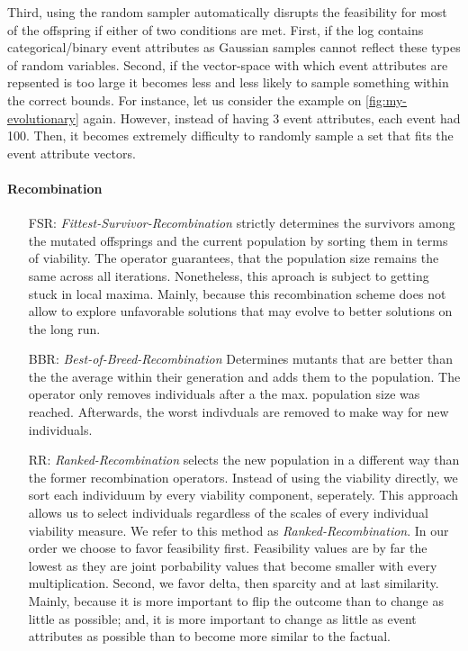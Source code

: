 \documentclass[./../../paper.tex]{subfiles}
\begin{document}
Third, using the random sampler automatically disrupts the feasibility for most of the offspring if either of two conditions are met. First, if the log contains categorical/binary event attributes as Gaussian samples cannot reflect these types of random variables. Second, if the vector-space with which event attributes are repsented is too large it becomes less and less likely to sample something within the correct bounds.
For instance, let us consider the example on \autoref{fig:my-evolutionary} again.
However, instead of having 3 event attributes, each event had 100. Then, it becomes extremely difficulty to randomly sample a set that fits the event attribute vectors.

\paragraph{Recombination}
\begin{enumerate}
    \item[FSR:] \emph{Fittest-Survivor-Recombination} strictly determines the survivors among the mutated offsprings and the current population by sorting them in terms of viability.
          The operator guarantees, that the population size remains the same across all iterations.
          Nonetheless, this aproach is subject to getting stuck in local maxima. Mainly, because this recombination scheme does not allow to explore unfavorable solutions that may evolve to better solutions on the long run.
    \item[BBR:] \emph{Best-of-Breed-Recombination} Determines mutants that are better than the the average within their generation and adds them to the population. The operator only removes individuals after a the max. population size was reached. Afterwards, the worst indivduals are removed to make way for new individuals.
    \item[RR:] \emph{Ranked-Recombination} selects the new population in a different way than the former recombination operators. Instead of using the viability directly, we sort each individuum by every viability component, seperately. This approach allows us to select individuals regardless of the scales of every individual viability measure. We refer to this method as \emph{Ranked-Recombination}. In our order we choose to favor feasibility first. Feasibility values are by far the lowest as they are joint porbability values that become smaller with every multiplication. Second, we favor delta, then sparcity and at last similarity. Mainly, because it is more important to flip the outcome than to change as little as possible; and, it is more important to change as little as event attributes as possible than to become more similar to the factual.
\end{enumerate}
\end{document}
